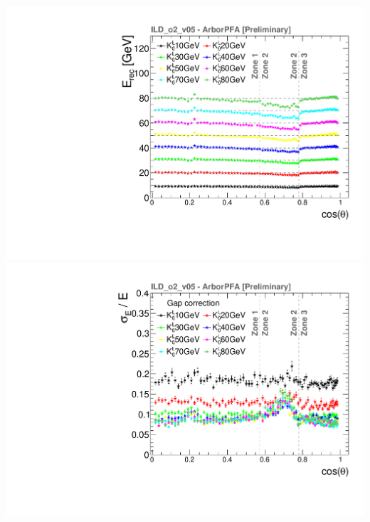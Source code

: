 \documentclass[8pt]{beamer}
\begin{document}
\begin{frame}
\begin{minipage}{0.5\linewidth}
\begin{center}
\begin{overprint}
           \centering \includegraphics[width=0.8\linewidth]{ERecLinGap_nofit_thesis.pdf} \\ \includegraphics[width=0.8\linewidth]{EResLinGap_thesis.pdf}
        \end{overprint}
      \end{center}
    \end{minipage}
  \end{frame}
\end{document}

